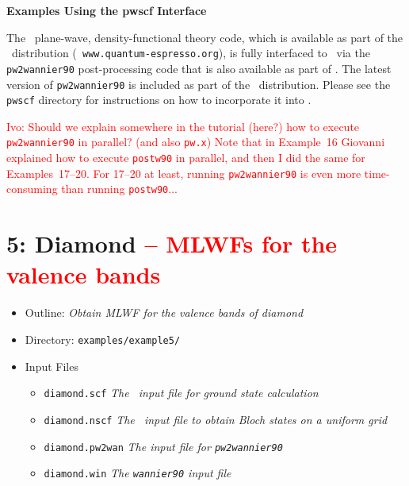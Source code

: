\documentclass[a4paper,11pt,twoside]{article}
\def\tent#1{\textcolor{red}{#1}}     %
\begin{document}
\cleardoublepage

\begin{center}
\Large{\bf Examples Using the {\sc pwscf} Interface}
\end{center}

The \pwscf\ plane-wave, density-functional theory code, which is
available as part of the \QE\ distribution ({\tt
  www.quantum-espresso.org}), is fully interfaced to \wannier\ via the
{\tt pw2wannier90} post-processing code that is also available as part
of \QE. The latest version of {\tt pw2wannier90} is included as part of 
the \wannier\ distribution. Please see the {\tt pwscf} directory for 
instructions on how to incorporate it into \pwscf. 

\textcolor{red}{Ivo: Should we explain somewhere in the tutorial
  (here?)  how to execute {\tt pw2wannier90} in parallel? (and also
  {\tt pw.x}) Note that in Example~16 Giovanni explained how to
  execute {\tt postw90} in parallel, and then I did the same for
  Examples~17--20. For 17--20 at least, running {\tt pw2wannier90} is
  even more time-consuming than running {\tt postw90}...}

\cleardoublepage

\section*{5: Diamond \tent{-- MLWFs for the valence bands}}
\begin{itemize}
\item{Outline: \it{Obtain MLWF for the valence bands of diamond}}
\item{Directory: {\tt examples/example5/}}
\item{Input Files}
\begin{itemize}
\item{ {\tt diamond.scf}  {\it The \pwscf\ input file for ground state
    calculation}} 
\item{ {\tt diamond.nscf}  {\it The \pwscf\ input file to obtain Bloch
    states on a uniform grid}} 
\item{ {\tt diamond.pw2wan}  {\it The input file for {\tt pw2wannier90}}}
\item{ {\tt diamond.win}  {\it The {\tt wannier90} input file}}
\end{itemize}
\end{itemize}
\end{document}
